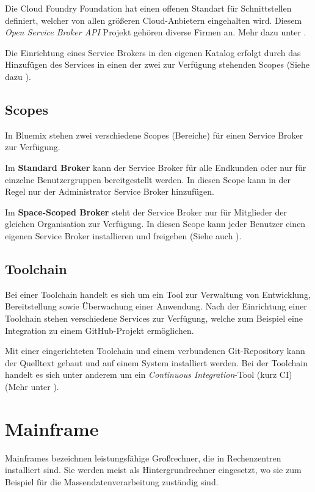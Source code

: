Die Cloud Foundry Foundation hat einen offenen Standart für Schnittstellen definiert, welcher von allen größeren
Cloud-Anbietern eingehalten wird. Diesem \textit{Open Service Broker API} Projekt gehören diverse Firmen an. Mehr dazu
unter \cite{online_grundlagen_servicebrokerapi}.

Die Einrichtung eines Service Brokers in den eigenen Katalog erfolgt durch das Hinzufügen des Services in einen der zwei
zur Verfügung stehenden Scopes (Siehe dazu \cite{online_grundlagen_servicebroker}).

\subsection{Scopes}
\label{sub:scopes}
In Bluemix stehen zwei verschiedene Scopes (Bereiche) für einen Service Broker zur Verfügung.

Im \textbf{Standard Broker} kann der Service Broker für alle Endkunden oder nur für einzelne Benutzergruppen bereitgestellt
werden. In diesen Scope kann in der Regel nur der Administrator Service Broker hinzufügen.

Im \textbf{Space-Scoped Broker} steht der Service Broker nur für Mitglieder der gleichen Organisation zur Verfügung. In
diesen Scope kann jeder Benutzer einen eigenen Service Broker installieren und freigeben
(Siehe auch \cite{online_grundlagen_servicebroker_scope}).

\subsection{Toolchain}
Bei einer Toolchain handelt es sich um ein Tool zur Verwaltung von Entwicklung, Bereitstellung sowie Überwachung einer
Anwendung. Nach der Einrichtung einer Toolchain stehen verschiedene Services zur Verfügung, welche zum Beispiel eine Integration
zu einem GitHub-Projekt ermöglichen.

Mit einer eingerichteten Toolchain und einem verbundenen Git-Repository kann der Quelltext gebaut und auf einem System
installiert werden. Bei der Toolchain handelt es sich unter anderem um ein \textit{Continuous Integration}-Tool (kurz CI)
(Mehr unter \cite{online_grundlagen_toolchain}).

\section{Mainframe}
Mainframes bezeichnen leistungsfähige Großrechner, die in Rechenzentren installiert sind. Sie werden meist als
Hintergrundrechner eingesetzt, wo sie zum Beispiel für die Massendatenverarbeitung zuständig sind.

